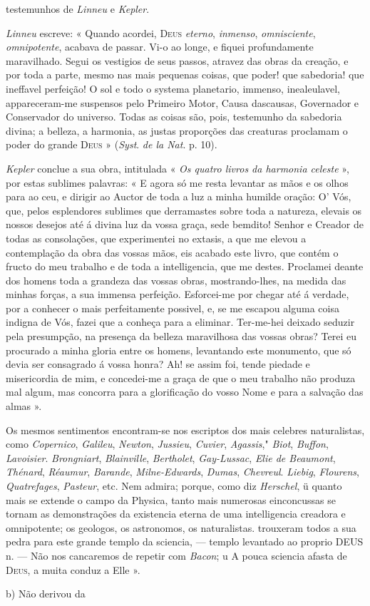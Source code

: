 testemunhos de \emph{Linneu} e \emph{Kepler}.\par \emph{Linneu} escreve: « Quando acordei, \textsc{Deus} \emph{eterno}, \emph{inmenso}, \emph{omnisciente}, \emph{omnipotente}, acabava de passar. Vi-o ao longe, e fiquei profundamente maravilhado. Segui os vestigios de seus passos, atravez das obras da creação, e por toda a parte, mesmo nas mais pequenas coisas, que poder! que sabedoria! que ineffavel perfeição! O sol e todo o systema planetario, immenso, inealeulavel, appareceram-me suspensos pelo Primeiro Motor, Causa dascausas, Governador e Conservador do universo. Todas as coisas são, pois, testemunho da sabedoria divina; a belleza, a harmonia, as justas proporções das creaturas proclamam o poder do grande \textsc{Deus} » (\emph{Syst}. \emph{de la Nat}. p. 10).\par \emph{Kepler} conclue a sua obra, intitulada « \emph{Os quatro livros da harmonia celeste} », por estas sublimes palavras: « E agora só me resta levantar as mãos e os olhos para ao ceu, e dirigir ao Auctor de toda a luz a minha humilde oração: O' Vós, que, pelos esplendores sublimes que derramastes sobre toda a natureza, elevais os nossos desejos até á divina luz da vossa graça, sede bemdito! Senhor e Creador de todas as consolações, que experimentei no extasis, a que me elevou a contemplação da obra das vossas mãos, eis acabado este livro, que contém o fructo do meu trabalho e de toda a intelligencia, que me destes. Proclamei deante dos homens toda a grandeza das vossas obras, mostrando-lhes, na medida das minhas forças, a sua immensa perfeição. Esforcei-me por chegar até á verdade, por a conhecer o mais perfeitamente possivel, e, se me escapou alguma coisa indigna de Vós, fazei que a conheça para a eliminar. Ter-me-hei deixado seduzir pela presumpção, na presença da belleza maravilhosa das vossas obras? Terei eu procurado a minha gloria entre os homens, levantando este monumento, que só devia ser consagrado á vossa honra? Ah! se assim foi, tende piedade e misericordia de mim, e concedei-me a graça de que o meu trabalho não produza mal algum, mas concorra para a glorificação do vosso Nome e para a salvação das almas ».\par Os mesmos sentimentos encontram-se nos escriptos dos mais celebres naturalistas, como \emph{Copernico}, \emph{Galileu}, \emph{Newton}, \emph{Jussieu}, \emph{Cuvier}, \emph{Agassis}," \emph{Biot}, \emph{Buffon}, \emph{Lavoisier}. \emph{Brongniart}, \emph{Blainville}, \emph{Bertholet}, \emph{Gay-Lussac}, \emph{Elie de Beaumont}, \emph{Thénard}, \emph{Réaumur}, \emph{Barande}, \emph{Milne-Edwards}, \emph{Dumas}, \emph{Chevreul}. \emph{Liebig}, \emph{Flourens}, \emph{Quatrefages}, \emph{Pasteur}, etc. Nem admira; porque, como diz \emph{Herschel}, ü quanto mais se extende o campo da Physica, tanto mais numerosas einconcussas se tornam as demonstrações da existencia eterna de uma intelligencia creadora e omnipotente; os geologos, os astronomos, os naturalistas. trouxeram todos a sua pedra para este grande templo da sciencia, --- templo levantado ao proprio \textsc{DEUS} n. --- Não nos cancaremos de repetir com \emph{Bacon}; u A pouca sciencia afasta de \textsc{Deus}, a muita conduz a Elle ».\par b) Não derivou da 